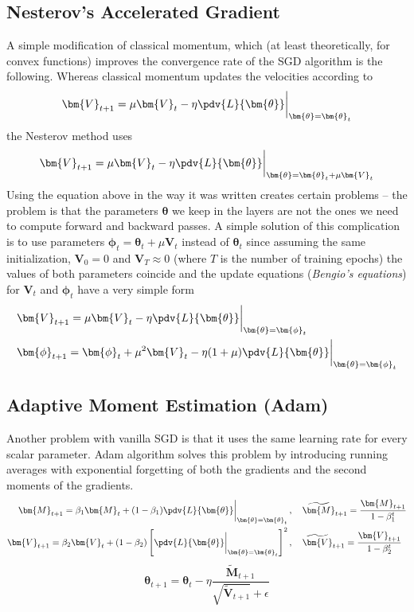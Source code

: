 \documentclass[a5paper]{article}
\begin{document}
\subsection{Nesterov's Accelerated Gradient}

A simple modification of classical momentum, which (at least theoretically, for convex functions)
improves the convergence rate of the SGD algorithm is the following. Whereas classical momentum
updates the velocities according to
\[
   \bm{V}_{t+1} = \mu \bm{V}_{t} - \eta \pdv{L}{\bm{\theta}}\bigg|_{\bm{\theta} = \bm{\theta}_t}
\]
the Nesterov method uses
\[
   \bm{V}_{t+1} = \mu \bm{V}_{t} - \eta \pdv{L}{\bm{\theta}}\bigg|_{\bm{\theta} = \bm{\theta}_t + \mu \bm{V}_t}
\]
Using the equation above in the way it was written creates certain problems -- the problem is that
the parameters $\bm{\theta}$ we keep in the layers are not the ones we need to compute forward and
backward passes. A simple solution of this complication is to use parameters $\bm{\phi}_t =
\bm{\theta}_t + \mu \bm{V}_t$ instead of $\bm{\theta}_t$ since assuming the same initialization,
$\bm{V}_0 = 0$ and $\bm{V}_{T} \approx 0$ (where $T$ is the number of training epochs) the values of
both parameters coincide and the update equations (\emph{\mbox{Bengio's} equations}) for $\bm{V}_t$
and $\bm{\phi}_t$ have a very simple form
\[
\begin{split}
   &\bm{V}_{t+1} = \mu \bm{V}_t - \eta \pdv{L}{\bm{\theta}}\bigg|_{\bm{\theta} = \bm{\phi}_t}\\
   &\bm{\phi}_{t+1} = \bm{\phi}_t + \mu^2 \bm{V}_t - \eta (1 + \mu) \pdv{L}{\bm{\theta}}\bigg|_{\bm{\theta} = \bm{\phi}_t}
\end{split}
\]


\subsection{Adaptive Moment Estimation (Adam)}

Another problem with vanilla SGD is that it uses the same learning rate for every scalar parameter.
Adam algorithm solves this problem by introducing running averages with exponential forgetting of
both the gradients and the second moments of the gradients.
\[
\begin{split} 
   \bm{M}_{t+1} = \beta_1 \bm{M}_t + (1 - \beta_1) \pdv{L}{\bm{\theta}}\bigg|_{\bm{\theta} = \bm{\theta}_t}&\,,\quad \widetilde{\bm{M}}_{t+1} = \frac{\bm{M}_{t+1}}{1 - \beta_1^t} \\
   \bm{V}_{t+1} = \beta_2 \bm{V}_t + (1 - \beta_2) \left[ \pdv{L}{\bm{\theta}}\bigg|_{\bm{\theta} = \bm{\theta}_t} \right]^2&\,,\quad \widetilde{\bm{V}}_{t+1} = \frac{\bm{V}_{t+1}}{1 - \beta_2^t}
\end{split}
\]
\[
   \bm{\theta}_{t+1} = \bm{\theta}_t - \eta \frac{\widetilde{\bm{M}}_{t+1}}{\sqrt{\widetilde{\bm{V}}_{t+1}} + \epsilon}
\]
\end{document}
